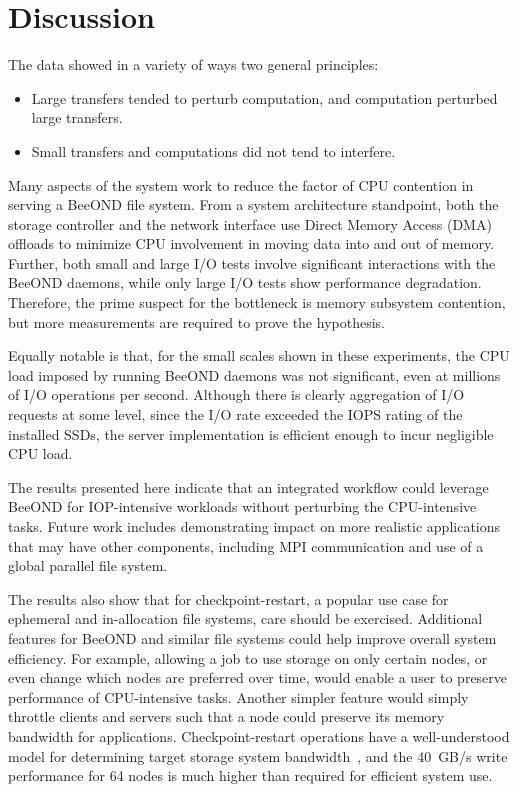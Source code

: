 \documentclass[conference]{IEEEtran}
\begin{document}
\section{Discussion}
The data showed in a variety of ways two general principles:
\begin{itemize}
  \item Large transfers tended to perturb computation, and computation
    perturbed large transfers.
  \item Small transfers and computations did not tend to interfere.
\end{itemize}

Many aspects of the system work to reduce the factor of CPU contention
in serving a BeeOND file system. From a system architecture
standpoint, both the storage controller and the network interface use
Direct Memory Access (DMA) offloads to minimize CPU involvement in
moving data into and out of memory. Further, both small and large I/O
tests involve significant interactions with the BeeOND daemons, while
only large I/O tests show performance degradation. Therefore, the
prime suspect for the bottleneck is memory subsystem contention, but
more measurements are required to prove the hypothesis.

Equally notable is that, for the small scales shown in these
experiments, the CPU load imposed by running BeeOND daemons was not
significant, even at millions of I/O operations per second. Although
there is clearly aggregation of I/O requests at some level, since the
I/O rate exceeded the IOPS rating of the installed SSDs, the server
implementation is efficient enough to incur negligible CPU load.

The results presented here indicate that an integrated workflow could
leverage BeeOND for IOP-intensive workloads without perturbing the
CPU-intensive tasks. Future work includes demonstrating impact on more
realistic applications that may have other components, including MPI
communication and use of a global parallel file system.

The results also show that for checkpoint-restart, a popular use case
for ephemeral and in-allocation file systems, care should be
exercised. Additional features for BeeOND and similar file systems
could help improve overall system efficiency. For example, allowing a
job to use storage on only certain nodes, or even change which nodes
are preferred over time, would enable a user to preserve performance
of CPU-intensive tasks. Another simpler feature would simply throttle
clients and servers such that a node could preserve its memory
bandwidth for applications. Checkpoint-restart operations have a
well-understood model for determining target storage system
bandwidth~\cite{daly}, and the 40~GB/s write performance for 64 nodes
is much higher than required for efficient system use.
\end{document}
